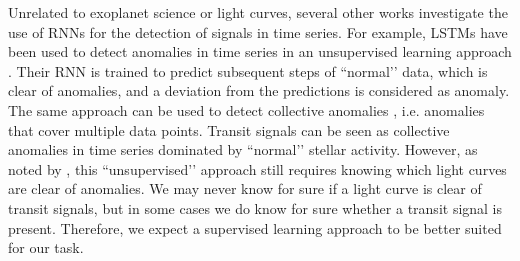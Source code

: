 Unrelated to exoplanet science or light curves, several other works investigate the use of RNNs for the detection of signals in time series. For example, LSTMs have been used to detect anomalies in time series in an unsupervised learning approach \citep{malhotra2015long}. Their RNN is trained to predict subsequent steps of ``normal’’ data, which is clear of anomalies, and a deviation from the predictions is considered as anomaly. The same approach can be used to detect collective anomalies \citep{bontemps2016collective}, i.e. anomalies that cover multiple data points. Transit signals can be seen as collective anomalies in time series dominated by ``normal’’ stellar activity. However, as noted by \cite{cherdo2020training}, this ``unsupervised’’ approach still requires knowing which light curves are clear of anomalies. We may never know for sure if a light curve is clear of transit signals, but in some cases we do know for sure whether a transit signal is present. Therefore, we expect a supervised learning approach to be better suited for our task.


